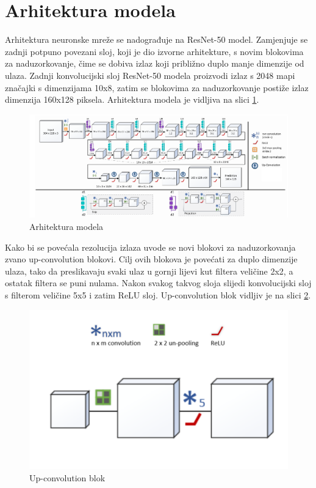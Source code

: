 \documentclass[times, utf8, zavrsni, numeric]{fer}
\begin{document}
\section{Arhitektura modela}
Arhitektura neuronske mreže se nadograđuje na ResNet-50 model. Zamjenjuje se
zadnji potpuno povezani sloj, koji je dio izvorne arhitekture, s novim blokovima
za naduzorkovanje, čime se dobiva izlaz koji približno duplo manje 
dimenzije od ulaza. Zadnji konvolucijski sloj ResNet-50 modela proizvodi 
izlaz s 2048 mapi značajki s dimenzijama 10x8, zatim se blokovima za 
naduzorkovanje postiže izlaz dimenzija 160x128 piksela. Arhitektura 
modela je vidljiva na slici \ref{fig:model}.
\begin{figure}[htb]
	\centering
	\includegraphics[scale=0.45]{model.png}
	\caption{Arhitektura modela}
	\label{fig:model}
\end{figure}

\indent Kako bi se povećala rezolucija izlaza uvode se novi blokovi za
naduzorkovanja zvano up-convolution blokovi. Cilj ovih blokova je
povećati za duplo dimenzije ulaza, tako da preslikavaju svaki ulaz
u gornji lijevi kut filtera veličine 2x2, a ostatak filtera se puni nulama. 
Nakon svakog takvog sloja slijedi konvolucijski sloj s filterom veličine 5x5 i 
zatim ReLU sloj. Up-convolution blok vidljiv je na slici \ref{fig:upconv}.

\begin{figure}[htb]
	\centering
	\includegraphics[scale=0.45]{up-conv.png}
	\caption{Up-convolution blok}
	\label{fig:upconv}
\end{figure}
\end{document}
